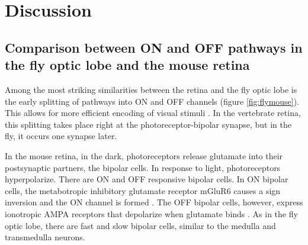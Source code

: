 \chapter{Discussion}
\label{chp:Discussion}
\section{Comparison between ON and OFF pathways in the fly optic lobe and the mouse retina}
Among the most striking similarities between the retina and the fly optic lobe is the early splitting of pathways into ON and OFF channels (figure \ref{fig:flymouse}). This allows for more efficient encoding of visual stimuli \parencite{Gjorgjieva2014}. In the vertebrate retina, this splitting takes place right at the photoreceptor-bipolar synapse, but in the fly, it occurs one synapse later.

In the mouse retina, in the dark, photoreceptors release glutamate into their postsynaptic partners, the bipolar cells. In response to light, photoreceptors hyperpolarize. There are ON and OFF responsive bipolar cells. In ON bipolar cells, the metabotropic inhibitory glutamate receptor mGluR6 causes a sign inversion and the ON channel is formed \parencite{Masu1995}. The OFF bipolar cells, however, express ionotropic AMPA receptors that depolarize when glutamate binds \parencite{Euler2014}. As in the fly optic lobe, there are fast and slow bipolar cells, similar to the medulla and transmedulla neurons.

